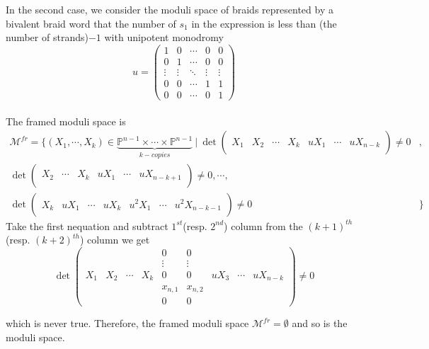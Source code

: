 \begin{example}
In the second case, we consider the moduli space of braids represented by a bivalent braid word that the number of  $s_1$ in the expression is less than (the number of strands)$-1$ with unipotent monodromy 
\[u= 
\begin{pmatrix}
	1&0&\cdots&0&0\\
	0&1&\cdots&0&0\\
	\vdots&\vdots&\ddots&\vdots&\vdots\\
	0&0&\cdots&1&1\\
	0&0&\cdots&0&1
\end{pmatrix}
\] \\
The framed moduli space is 
		\begin{align*}
		\mathcal{M}^{fr}=
		\{(X_1,\cdots,X_{k}) \in 										\underbrace{\mathbb{P}^{n-1}\times \cdots \times \mathbb{P}			^{n-1}}_{k-copies}~|~		
		 \operatorname{det}
		\left( \begin{array}{c|c|c|c|c|c|c}
			& & & & & &\\
			X_1&X_2&\cdots&X_{k}&uX_1&\cdots& uX_{n-k}\\
			& & & & & &
		\end{array}\right)
		\neq 0&, \\
		\operatorname{det}
		\left( \begin{array}{c|c|c|c|c|c}
			& & & & &\\
			X_2&\cdots&X_{k}&uX_1&\cdots& uX_{n-k+1}\\
			& & & & &
		\end{array}\right)
		\neq 0,
		\cdots,&\\
		 \operatorname{det}
		\left( \begin{array}{c|c|c|c|c|c|c}
			& & & & & &\\
			X_k&uX_1&\cdots&uX_{k}&u^2 X_1&\cdots& u^2 X_{n-k-1}\\
			& & & & & &
		\end{array}\right)
		\neq 0&
		\}
	\end{align*}
Take the first nequation and subtract $1^{st}$(resp. $2^{nd}$) column from the $(k+1)^{th}$(resp. $(k+2)^{th}$) column we get
\[
	\operatorname{det}
		\left( \begin{array}{c|c|c|c|c|c|c|c|c}
		&   &   &      &0      & 0     & &    &                \\
		&   &   &      &\vdots &\vdots & &    &            \\
		X_1 &X_2&\cdots&X_{k}  &0      &0&uX_3&\cdots&uX_{n-k}\\
		&   &   &      &x_{n,1}&x_{n,2}& &    &            \\
		&   &   &      &0      &0      & &    &
		\end{array}\right)
		\neq 0
\]

which is never true. Therefore, the framed moduli  space $\mathcal{M}^{fr}=\emptyset$ and so is the moduli space.
\end{example}

